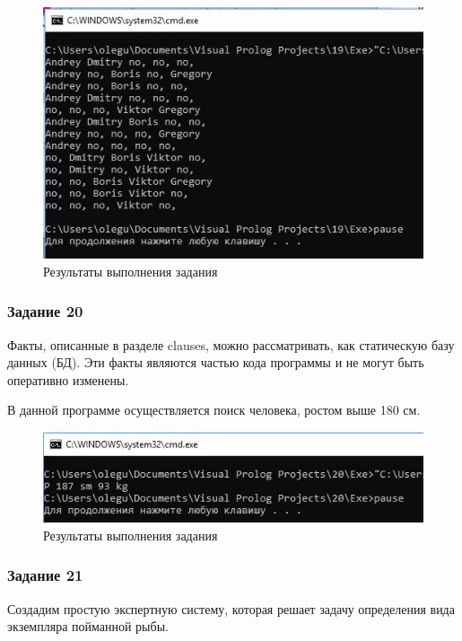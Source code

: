 \documentclass[14pt,a4paper,report]{report}
\begin{document}
\begin{figure}[h!]
	\centering
	\includegraphics[scale = 0.9]{images/d19.png}
	\caption{Результаты выполнения задания}
\end{figure}
\clearpage
\subsubsection{Задание 20}

Факты, описанные в разделе clauses, можно рассматривать, как статическую базу данных (БД). Эти факты являются частью кода программы и не могут быть оперативно изменены. 

В данной программе осуществляется поиск человека, ростом выше 180 см. 



\begin{figure}[h!]
	\centering
	\includegraphics[scale = 0.9]{images/d20.png}
	\caption{Результаты выполнения задания}
\end{figure}
\clearpage
\subsubsection{Задание 21}

Создадим простую экспертную систему, которая решает задачу определения вида экземпляра пойманной рыбы.
\end{document}

